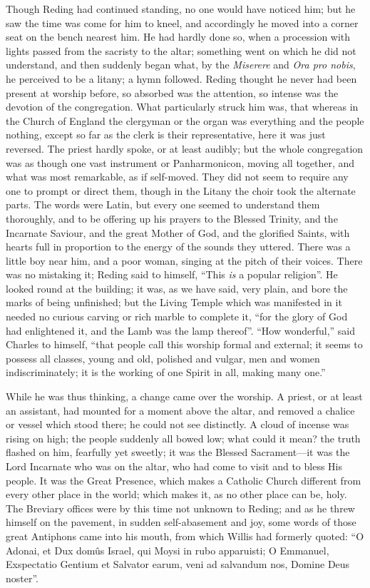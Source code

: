 Though Reding had continued standing, no one would have noticed
him; but he saw the time was come for him to kneel, and accordingly he
moved into a corner seat on the bench nearest him. He had hardly done
so, when a procession with lights passed from the sacristy to the
altar; something went on which he did not understand, and then
suddenly began what, by the \emph{Miserere} and \emph{Ora pro nobis},
he perceived to be a litany; a hymn followed. Reding thought he never
had been present at worship before, so absorbed was the attention, so
intense was the devotion of the congregation. What particularly struck
him was, that whereas in the Church of England the clergyman or the
organ was everything and the people nothing, except so far as the
clerk is their representative, here it was just reversed. The priest
hardly spoke, or at least audibly; but the whole congregation was as
though one vast instrument or Panharmonicon, moving all together, and
what was most remarkable, as if self-moved. They did not seem to
require any one to prompt or direct them, though in the Litany the
choir took the alternate parts. The words were Latin, but every one
seemed to understand them thoroughly, and to be offering up his
prayers to the Blessed Trinity, and the Incarnate Saviour, and the
great Mother of God, and the glorified Saints, with hearts full in
proportion to the energy of the sounds they uttered. There was a
little boy near him, and a poor woman, singing at the pitch of their
voices. There was no mistaking it; Reding said to himself, ``This \emph{is}
a popular religion''. He looked round at the building; it was, as
we have said, very plain, and bore the marks of being
unfinished; but the Living Temple which was manifested in it needed no
curious carving or rich marble to complete it, ``for the glory of
God had enlightened it, and the Lamb was the lamp thereof''.
``How wonderful,'' said Charles to himself, ``that people
call this worship formal and external; it seems to possess all
classes, young and old, polished and vulgar, men and women
indiscriminately; it is the working of one Spirit in all, making many
one.''

While he was thus thinking, a change came over the worship. A
priest, or at least an assistant, had mounted for a moment above the
altar, and removed a chalice or vessel which stood there; he could not
see distinctly. A cloud of incense was rising on high; the people
suddenly all bowed low; what could it mean? the truth flashed on him,
fearfully yet sweetly; it was the Blessed Sacrament—it was the Lord
Incarnate who was on the altar, who had come to visit and to bless His
people. It was the Great Presence, which makes a Catholic Church
different from every other place in the world; which makes it, as no
other place can be, holy. The Breviary offices were by this time not
unknown to Reding; and as he threw himself on the pavement, in sudden
self-abasement and joy, some words of those great Antiphons came into
his mouth, from which Willis had formerly quoted: ``O Adonai, et
Dux domûs Israel, qui Moysi in rubo apparuisti; O Emmanuel,
Exspectatio Gentium et Salvator earum, veni ad salvandum nos, Domine
Deus noster''.


